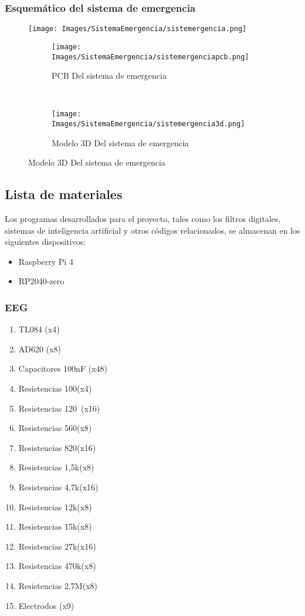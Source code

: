 \documentclass{article}
\begin{document}
\subsubsection{Esquemático del sistema de emergencia}
\begin{figure}[H]
    \centering
    \texttt{[image: Images/SistemaEmergencia/sistemergencia.png]}
    \caption{Esquemático del sistema de emegencia}


    \begin{subfigure}[t]{0.5\textwidth}
        \centering
        \texttt{[image: Images/SistemaEmergencia/sistemergenciapcb.png]}
        \caption{PCB Del sistema de emergencia}
    \end{subfigure}%
    ~ 
    \begin{subfigure}[t]{0.5\textwidth}
        \centering
        \texttt{[image: Images/SistemaEmergencia/sistemergencia3d.png]}
        \caption{Modelo 3D Del sistema de emergencia}
    \end{subfigure}

\end{figure}

\subsection{Lista de materiales}
Los programas desarrollados para el proyecto, tales como los filtros digitales, sistemas de inteligencia artificial y otros códigos relacionados, se almacenan en los siguientes dispositivos:

\begin{itemize}
    \item Raspberry Pi 4
    \item RP2040-zero
\end{itemize}

\subsubsection{EEG}
\begin{enumerate}
    \item TL084 (x4)
    \item AD620 (x8)
    \item Capacitores 100nF (x48)
    \item Resistencias 100\omega (x4)
    \item Resistencias 120\ (x16)
    \item Resistencias 560\Ω (x8) 
    \item Resistencias 820\Ω (x16)
    \item Resistencias 1,5k\Ω (x8)
    \item Resistencias 4,7k\Ω (x16)
    \item Resistencias 12k\Ω (x8)
    \item Resistencias 15k\Ω (x8)
    \item Resistencias 27k\Ω (x16)
    \item Resistencias 470k\Ω (x8)
    \item Resistencias 2,7M\Ω (x8)
    \item Electrodos (x9)
\end{enumerate}
\end{document}
